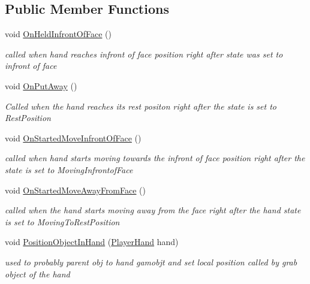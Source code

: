 \subsection*{Public Member Functions}
\begin{DoxyCompactItemize}
\item 
void \mbox{\hyperlink{interface_i_holdable_object_a6f63fec8fb8f715ad5cdd08aa5ec0ea5}{On\+Held\+Infront\+Of\+Face}} ()
\begin{DoxyCompactList}\small\item\em called when hand reaches infront of face position right after state was set to infront of face \end{DoxyCompactList}\item 
void \mbox{\hyperlink{interface_i_holdable_object_abe7c5e5ed97fb5c908c91da5b8714f0e}{On\+Put\+Away}} ()
\begin{DoxyCompactList}\small\item\em Called when the hand reaches it\textquotesingle{}s rest positon right after the state is set to Rest\+Position \end{DoxyCompactList}\item 
void \mbox{\hyperlink{interface_i_holdable_object_af5dcdd5524539104706dadd8a0e15e08}{On\+Started\+Move\+Infront\+Of\+Face}} ()
\begin{DoxyCompactList}\small\item\em called when hand starts moving towards the infront of face position right after the state is set to Moving\+Infrontof\+Face \end{DoxyCompactList}\item 
void \mbox{\hyperlink{interface_i_holdable_object_a75f802a9736db51e5e8d1568689dd11c}{On\+Started\+Move\+Away\+From\+Face}} ()
\begin{DoxyCompactList}\small\item\em called when the hand starts moving away from the face right after the hand state is set to Moving\+To\+Rest\+Position \end{DoxyCompactList}\item 
void \mbox{\hyperlink{interface_i_holdable_object_a3fe2e7a7d0740225142053583f438333}{Position\+Object\+In\+Hand}} (\mbox{\hyperlink{class_player_hand}{Player\+Hand}} hand)
\begin{DoxyCompactList}\small\item\em used to probably parent obj to hand gamobjt and set local position called by grab object of the hand \end{DoxyCompactList}\item 

\end{DoxyCompactItemize}
